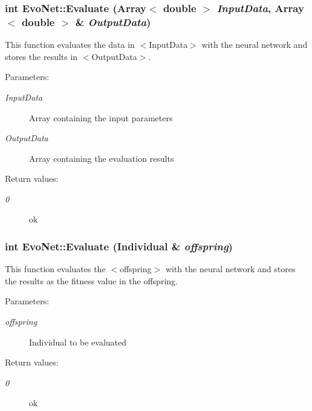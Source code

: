 \subsubsection{\setlength{\rightskip}{0pt plus 5cm}int Evo\-Net::Evaluate (Array$<$ double $>$ {\em Input\-Data}, Array$<$ double $>$ \& {\em Output\-Data})}\label{classEvoNet_a10}


This function evaluates the data in $<$Input\-Data$>$ with the neural network and stores the results in $<$Output\-Data$>$.

\begin{Desc}
\item[Parameters: ]\par
\begin{description}
\item[{\em 
Input\-Data}]Array containing the input parameters  \item[{\em 
Output\-Data}]Array containing the evaluation results \end{description}
\end{Desc}
\begin{Desc}
\item[Return values: ]\par
\begin{description}
\item[{\em 
0}]ok \end{description}
\end{Desc}
\subsubsection{\setlength{\rightskip}{0pt plus 5cm}int Evo\-Net::Evaluate (Individual \& {\em offspring})}\label{classEvoNet_a9}


This function evaluates the $<$offspring$>$ with the neural network and stores the results as the fitness value in the offspring.

\begin{Desc}
\item[Parameters: ]\par
\begin{description}
\item[{\em 
offspring}]Individual to be evaluated \end{description}
\end{Desc}
\begin{Desc}
\item[Return values: ]\par
\begin{description}
\item[{\em 
0}]ok \end{description}
\end{Desc}
